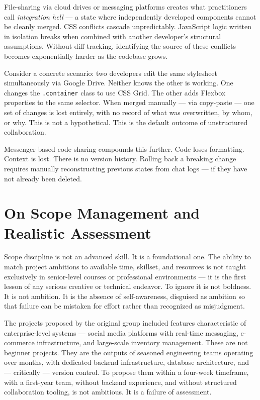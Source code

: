 \documentclass[11pt,a4paper]{book}
\begin{document}
File-sharing via cloud drives or messaging platforms creates what practitioners call \emph{integration hell} --- a state where independently developed components cannot be cleanly merged. CSS conflicts cascade unpredictably. JavaScript logic written in isolation breaks when combined with another developer's structural assumptions. Without diff tracking, identifying the source of these conflicts becomes exponentially harder as the codebase grows.
 
Consider a concrete scenario: two developers edit the same stylesheet simultaneously via Google Drive. Neither knows the other is working. One changes the \texttt{.container} class to use CSS Grid. The other adds Flexbox properties to the same selector. When merged manually --- via copy-paste --- one set of changes is lost entirely, with no record of what was overwritten, by whom, or why. This is not a hypothetical. This is the default outcome of unstructured collaboration.
 
Messenger-based code sharing compounds this further. Code loses formatting. Context is lost. There is no version history. Rolling back a breaking change requires manually reconstructing previous states from chat logs --- if they have not already been deleted.
 
\section{On Scope Management and Realistic Assessment}
 
Scope discipline is not an advanced skill. It is a foundational one. The ability to match project ambitions to available time, skillset, and resources is not taught exclusively in senior-level courses or professional environments --- it is the first lesson of any serious creative or technical endeavor. To ignore it is not boldness. It is not ambition. It is the absence of self-awareness, disguised as ambition so that failure can be mistaken for effort rather than recognized as misjudgment.
 
The projects proposed by the original group included features characteristic of enterprise-level systems --- social media platforms with real-time messaging, e-commerce infrastructure, and large-scale inventory management. These are not beginner projects. They are the outputs of seasoned engineering teams operating over months, with dedicated backend infrastructure, database architecture, and --- critically --- version control. To propose them within a four-week timeframe, with a first-year team, without backend experience, and without structured collaboration tooling, is not ambitious. It is a failure of assessment.
 
\end{document}
